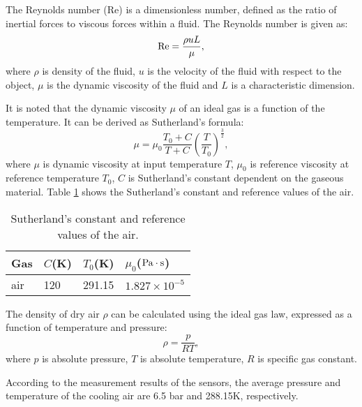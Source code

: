 The Reynolds number (Re) is a dimensionless number, defined as the ratio of inertial forces to viscous forces within a fluid.
The Reynolds number is given as:
\[{\rm{Re}} = \frac{{\rho uL}}{\mu },\]
where
$\rho$ is density of the fluid, $u$ is the velocity of the fluid with respect to the object, $\mu$ is the dynamic viscosity of the fluid and $L$ is a characteristic dimension.

It is noted that the dynamic viscosity $\mu$ of an ideal gas is a function of the temperature. It can be derived as Sutherland's formula:
\[\mu  = {\mu _0}\frac{{{T_0} + C}}{{T + C}}{\left( {\frac{T}{{{T_0}}}} \right)^{\frac{3}{2}}},\]
where $\mu$ is dynamic viscosity at input temperature $T$,
$\mu_0$ is reference viscosity at reference temperature $T_0$,
$C$ is Sutherland's constant dependent on the gaseous material.
Table \ref{tab:SutherlandConstant} shows the Sutherland's constant and reference values of the air.
\begin{table}[htbp]
  \centering
  \caption{Sutherland's constant and reference values of the air.}
    \begin{tabular}{p{2cm}p{2cm}p{2cm}p{3cm}}
    \toprule
    Gas   & $C$(K) & $T_0$(K) & $\mu_0$($\rm{Pa\cdot s}$) \\
    \midrule
    air   & 120   & 291.15 & $1.827\times 10^{-5}$ \\
    \bottomrule
    \end{tabular}%
  \label{tab:SutherlandConstant}%
\end{table}%

The density of dry air $\rho$ can be calculated using the ideal gas law, expressed as a function of temperature and pressure:
\begin{equation}
\rho  = \frac{p}{{RT}},
\label{Equ:AirDensity}
\end{equation}
where
$p$ is absolute pressure,
$T$ is absolute temperature,
$R$ is specific gas constant.

According to the measurement results of the sensors, the average pressure and temperature of the cooling air are 6.5 bar and 288.15K, respectively.

